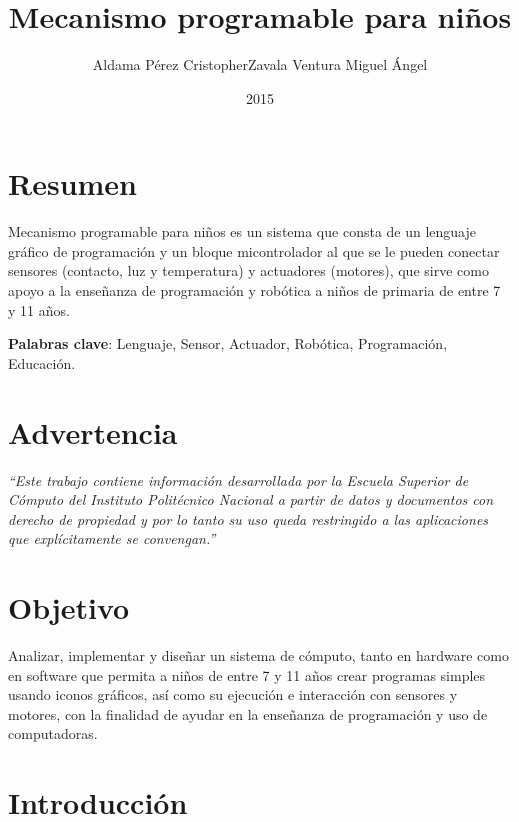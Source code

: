 \documentclass[letterpaper,10pt]{article}
\title{Mecanismo programable para niños}
\author{Aldama Pérez Cristopher\newline Zavala Ventura Miguel Ángel }
\date{2015}
\begin{document}
\maketitle
{}
\newpage
{}

\section{Resumen}

Mecanismo programable para niños es un sistema que consta de un lenguaje gráfico 
de programación y un bloque micontrolador al que se le pueden conectar sensores 
(contacto, luz y temperatura) y actuadores (motores), que sirve como apoyo a la 
enseñanza de programación y robótica a niños de primaria de entre 7 y 11 años.\newline

\textbf{Palabras clave}: Lenguaje, Sensor, Actuador, Robótica, Programación, Educación.

\newpage
\section{Advertencia}
\textit{``Este trabajo contiene información desarrollada por la Escuela
 Superior de Cómputo del Instituto Politécnico Nacional a partir de datos y documentos
  con derecho de propiedad y por lo tanto su uso queda restringido a las 
  aplicaciones que explícitamente se convengan.''}

\newpage  
\tableofcontents
\newpage
  
\newpage
\section{Objetivo}

Analizar, implementar y diseñar un sistema de cómputo, tanto en hardware como
en software que permita a niños de entre 7 y 11 años crear programas simples
usando iconos gráficos, así como su ejecución e interacción con sensores y motores,
con la finalidad de ayudar en la enseñanza de programación y uso de computadoras.

\newpage
\section{Introducción}
\end{document}
